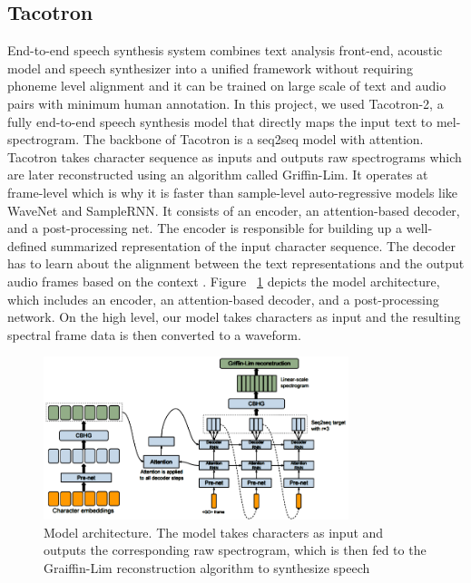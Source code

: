 \documentclass[journal,transmag]{JIISTjrnl}
\begin{document}
\subsection{Tacotron}
End-to-end speech synthesis system combines text analysis front-end, acoustic model and speech synthesizer into a unified framework without requiring phoneme level alignment and it can be trained on large scale of text and audio pairs with minimum human annotation. In this project, we used Tacotron-2, a fully end-to-end speech synthesis model that directly maps the input text to mel-spectrogram. The backbone of Tacotron is a seq2seq model with attention. Tacotron takes character sequence as inputs and outputs raw spectrograms which are later reconstructed using an algorithm called Griffin-Lim. It operates at frame-level which is why it is faster than sample-level auto-regressive models like WaveNet and SampleRNN. It consists of an encoder, an attention-based decoder, and a post-processing net. The encoder is responsible for building up a well-defined summarized representation of the input character sequence. The decoder has to learn about the alignment between the text representations and the output audio frames based on the context \cite{b3}. Figure ~\ref{Fig:1} depicts the model architecture, which includes an encoder, an attention-based decoder, and a post-processing network. On the high level, our model takes characters as input and the resulting spectral frame data is then converted to a waveform.
\begin{figure}[H]
\centering
\includegraphics[width=3.5in]{tacotron.png}
\caption{Model architecture. The model takes characters as input and outputs the corresponding raw spectrogram, which is then fed to the Graiffin-Lim reconstruction algorithm to synthesize speech}
\label{Fig:1}
\end{figure}
\end{document}
